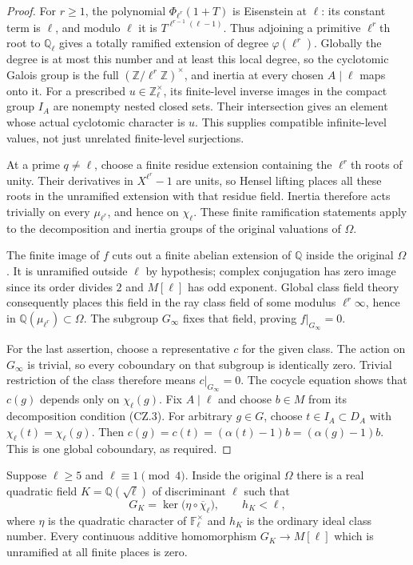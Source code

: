 \begin{proof}
For $r\ge1$, the polynomial
$\Phi_{\ell^r}(1+T)$ is Eisenstein at $\ell$: its constant
term is $\ell$, and modulo $\ell$ it is
$T^{\ell^{r-1}(\ell-1)}$.  Thus adjoining a primitive
$\ell^r$th root to $\mathbb Q_\ell$ gives a totally ramified
extension of degree $\varphi(\ell^r)$.  Globally the degree is
at most this number and at least this local degree, so the
cyclotomic Galois group is the full
$(\mathbb Z/\ell^r\mathbb Z)^\times$, and inertia at every
chosen $A\mid\ell$ maps onto it.  For a prescribed
$u\in\mathbb Z_\ell^\times$, its finite-level inverse images
in the compact group $I_A$ are nonempty nested closed sets.
Their intersection gives an element whose actual cyclotomic
character is $u$.  This supplies compatible infinite-level values,
not just unrelated finite-level surjections.

At a prime $q\ne\ell$, choose a finite residue extension containing
the $\ell^r$th roots of unity.  Their derivatives in
$X^{\ell^r}-1$ are units, so Hensel lifting places all these
roots in the unramified extension with that residue field.  Inertia
therefore acts trivially on every $\mu_{\ell^r}$, and hence on
$\chi_\ell$.  These finite ramification statements apply to the
decomposition and inertia groups of the original valuations of
$\Omega$.

The finite image of $f$ cuts out a finite abelian extension of
$\mathbb Q$ inside the original $\Omega$.  It is unramified
outside $\ell$ by hypothesis; complex conjugation has zero image
since its order divides $2$ and $M[\ell]$ has odd exponent.
Global class field theory consequently places this field in the
ray class field of some modulus $\ell^r\infty$, hence in
$\mathbb Q(\mu_{\ell^r})\subset\Omega$.
The subgroup $G_\infty$ fixes that field, proving $f|_{G_\infty}=0$.

For the last assertion, choose a representative $c$ for the given
class.  The action on $G_\infty$ is trivial, so every coboundary
on that subgroup is identically zero.  Trivial restriction of the
class therefore means $c|_{G_\infty}=0$.  The cocycle equation
shows that $c(g)$ depends only on $\chi_\ell(g)$.
Fix $A\mid\ell$ and choose $b\in M$ from its decomposition
condition (CZ.3).  For arbitrary $g\in G$, choose
$t\in I_A\subset D_A$ with $\chi_\ell(t)=\chi_\ell(g)$.
Then $c(g)=c(t)=(\alpha(t)-1)b=(\alpha(g)-1)b$.
This is one global coboundary, as required.
\end{proof}

\begin{proposition}
\label{prop:cz-quadratic-class-number}
Suppose $\ell\ge5$ and $\ell\equiv1\pmod4$.  Inside the
original $\Omega$ there is a real quadratic field
$K=\mathbb Q(\sqrt\ell)$ of discriminant $\ell$ such that
\[
 G_K=\ker\bigl(\eta\circ\overline\chi_\ell\bigr),
 \qquad h_K<\ell,
 \tag{CZ.5}
\]
where $\eta$ is the quadratic character of
$\mathbb F_\ell^\times$ and $h_K$ is the ordinary ideal class
number.  Every continuous additive homomorphism
$G_K\to M[\ell]$ which is unramified at all finite places is
zero.
\end{proposition}

